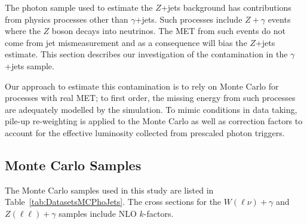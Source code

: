 The photon sample used to estimate the $Z$+jets background has contributions from physics processes other than $\gamma$+jets.
Such processes include $Z+\gamma$ events where the $Z$ boson decays into neutrinos. The MET from such events do not come from
jet mismeasurement and as a consequence will bias the $Z$+jets estimate. This section describes our investigation of the 
contamination in the $\gamma$+jets sample.

Our approach to estimate this contamination is to rely on Monte Carlo for processes with real MET; to first order, the missing
energy from such processes are adequately modelled by the simulation. To mimic conditions in data taking, pile-up re-weighting
is applied to the Monte Carlo as well as correction factors to account for the effective luminosity collected from prescaled
photon triggers. 

\subsection{Monte Carlo Samples}

The Monte Carlo samples used in this study are listed in Table~\ref{tab:DatasetsMCPhoJets}. The cross sections for the $W(\ell\nu)+\gamma$ 
and $Z(\ell\ell)+\gamma$ samples include NLO $k$-factors.

